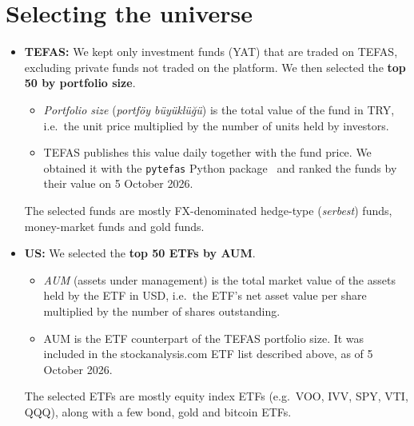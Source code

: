 \documentclass[11pt,a4paper]{article}
\begin{document}
\section{Selecting the universe}
\begin{itemize}
  \item \textbf{TEFAS:} We kept only investment funds (YAT) that are traded on TEFAS,
        excluding private funds not traded on the platform. We then selected the
        \textbf{top 50 by portfolio size}.
        \begin{itemize}
          \item \emph{Portfolio size} (\emph{portföy büyüklüğü}) is the total value of the
                fund in TRY, i.e.\ the unit price multiplied by the number of units held by
                investors.
          \item TEFAS publishes this value daily together with the fund price. We obtained it
                with the \texttt{pytefas} Python package~\cite{pytefas} and ranked the funds
                by their value on 5 October 2026.
        \end{itemize}
        The selected funds are mostly FX-denominated hedge-type (\emph{serbest}) funds,
        money-market funds and gold funds.
  \item \textbf{US:} We selected the \textbf{top 50 ETFs by AUM}.
        \begin{itemize}
          \item \emph{AUM} (assets under management) is the total market value of the assets
                held by the ETF in USD, i.e.\ the ETF's net asset value per share multiplied
                by the number of shares outstanding.
          \item AUM is the ETF counterpart of the TEFAS portfolio size. It was included in the
                stockanalysis.com ETF list described above, as of 5 October 2026.
        \end{itemize}
        The selected ETFs are mostly equity index ETFs (e.g.\ VOO, IVV, SPY, VTI, QQQ),
        along with a few bond, gold and bitcoin ETFs.
\end{itemize}
\end{document}
